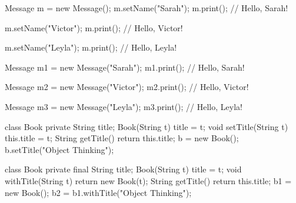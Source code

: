 \documentclass{article}
\begin{document}

\pptToc


\begin{pptWide}{2}
{\small\begin{ffcode}
Message m = new Message();
m.setName("Sarah");
m.print(); // Hello, Sarah!

m.setName("Victor");
m.print(); // Hello, Victor!

m.setName("Leyla");
m.print(); // Hello, Leyla!
\end{ffcode}
}
\par\columnbreak\par
{\small\begin{ffcode}
Message m1 = new Message("Sarah");
m1.print(); // Hello, Sarah!

Message m2 = new Message("Victor");
m2.print(); // Hello, Victor!

Message m3 = new Message("Leyla");
m3.print(); // Hello, Leyla!
\end{ffcode}
}
\end{pptWide}
\par
\plush{}


\begin{pptWide}{2}
{\small\begin{ffcode}
class Book {
  private String title;
  Book(String t) { title = t; }
  void setTitle(String t) {
    this.title = t;
  }
  String getTitle() {
    return this.title;
  }
}
b = new Book();
b.setTitle("Object Thinking");
\end{ffcode}
}
\par\columnbreak\par
{\small\begin{ffcode}
class Book {
  private final String title;
  Book(String t) { title = t; }
  void withTitle(String t) {
    return new Book(t);
  }
  String getTitle() {
    return this.title;
  }
}
b1 = new Book();
b2 = b1.withTitle("Object Thinking");
\end{ffcode}
}
\end{pptWide}
\par
\plush{}

\end{document}
